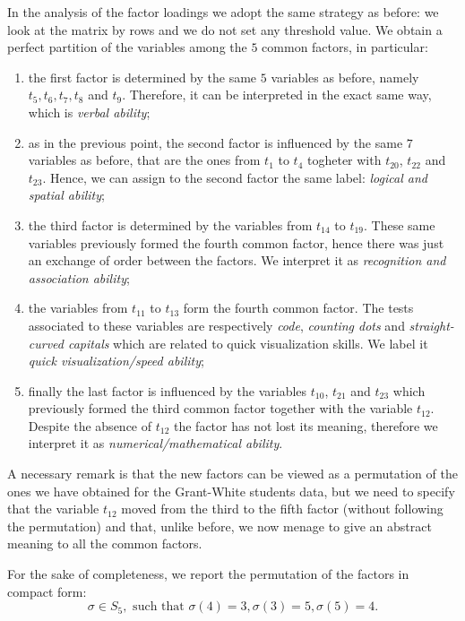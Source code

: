 \documentclass[
]{article}
\theoremstyle{plain}
\begin{document}
In the analysis of the factor loadings we adopt the same strategy as
before: we look at the matrix by rows and we do not set any threshold
value. We obtain a perfect partition of the variables among the \(5\)
common factors, in particular:

\begin{enumerate}
    \item   
        the first factor is determined by the same $5$ variables as before, namely $t_5, t_6, t_7, t_8$ and $t_9$. Therefore, it can be interpreted in the exact same way, which is \textit{verbal ability};
    \item
        as in the previous point, the second factor is influenced by the same $7$ variables as before, that are the ones from $t_1$ to $t_4$ togheter with $t_{20}$, $t_{22}$ and $t_{23}$. Hence, we can assign to the second factor the same label: \textit{logical and spatial ability};
    \item
        the third factor is determined by the variables from $t_{14}$ to $t_{19}$. These same variables previously formed the fourth common factor, hence there was just an exchange of order between the factors. We interpret it as \textit{recognition and association ability};
    \item
        the variables from $t_{11}$ to $t_{13}$ form the fourth common factor. The tests associated to these variables are respectively \textit{code}, \textit{counting dots} and \textit{straight-curved capitals} which are related to quick visualization skills. We label it \textit{quick visualization/speed ability};
    \item 
        finally the last factor is influenced by the variables $t_{10}$, $t_{21}$ and $t_{23}$ which previously formed the third common factor together with the variable $t_{12}$. Despite the absence of $t_{12}$ the factor has not lost its meaning, therefore we interpret it as \textit{numerical/mathematical ability}.
\end{enumerate}

A necessary remark is that the new factors can be viewed as a
permutation of the ones we have obtained for the Grant-White students
data, but we need to specify that the variable \(t_{12}\) moved from the
third to the fifth factor (without following the permutation) and that,
unlike before, we now menage to give an abstract meaning to all the
common factors.

For the sake of completeness, we report the permutation of the factors
in compact form: \[
    \sigma \in S_5, \text{ such that } \sigma(4) = 3, \sigma(3) = 5, \sigma(5) = 4.
\]
\end{document}
